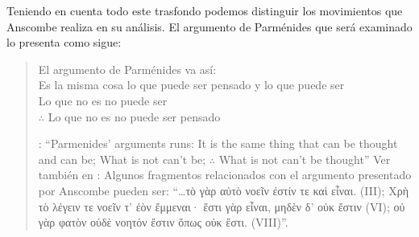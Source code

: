 Teniendo en cuenta todo este trasfondo podemos distinguir los movimientos que Anscombe realiza en su análisis. El argumento de Parménides que será examinado lo presenta como sigue: \blockquote[{\Cite[3]{anscombe1981parmenides:pmc}}: \enquote{Parmenides' arguments runs: It is the same thing that can be thought and can be; What is not can't be; $\therefore$ What is not can't be thought} Ver también en {\cite[22-25]{parmenides2007poema}}: Algunos fragmentos relacionados con el argumento presentado por Anscombe pueden ser: \enquote{\ldots\textgreek{τὸ γὰρ αὐτὸ νοεῖν ἐστίν τε καὶ εἶναι.} (III); \textgreek{Χρὴ τὸ λέγειν τε νοεῖν τ' ἐὸν ἔμμεναι· ἔστι γὰρ εἶναι, μηδὲν δ' οὐκ ἔστιν} (VI); \textelp{} \textgreek{οὐ γὰρ φατὸν οὐδὲ νοητόν ἔστιν ὅπως οὐκ ἔστι.} (VIII)}.]{El argumento de Parménides va así:\\
Es la misma cosa lo que puede ser pensado y lo que puede ser\\
Lo que no es no puede ser\\
$\therefore$ Lo que no es no puede ser pensado}

